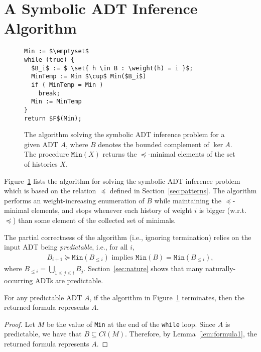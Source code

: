 \section{A Symbolic ADT Inference Algorithm}
\label{sec:algorithm}

\begin{figure}
\begin{lstlisting}
Min := $\emptyset$
while (true) {
  $B_i$ := $ \set{ h \in B : \weight(h) = i }$;
  MinTemp := Min $\cup$ Min($B_i$)
  if ( MinTemp = Min )
    break;
  Min := MinTemp
}
return $F$(Min);
\end{lstlisting}
\caption{The algorithm solving the symbolic ADT inference problem for a given ADT $A$, where $B$ denotes the bounded complement of $\ker A$. The procedure $\texttt{Min}(X)$ returns the $\preceq$-minimal elements of the set of histories $X$. %
}
\label{fig:algorithm}
\end{figure}

Figure~\ref{fig:algorithm} lists the algorithm for solving the symbolic ADT inference problem which is based on the relation $\preceq$
defined in Section~\ref{sec:patterns}.
The algorithm performs an weight-increasing enumeration of $B$ while maintaining the
$\preceq$-minimal elements, and stops whenever each history of weight $i$ is bigger (w.r.t. $\preceq$) than some
element of the collected set of minimals.

The partial correctness of the algorithm (i.e., ignoring termination) relies on the input ADT being \emph{predictable}, i.e.,
for all $i$,
\begin{align*}
B_{i+1} \succeq \texttt{Min}(B_{\leq i}) \mbox{ implies } \texttt{Min}(B) = \texttt{Min}(B_{\leq i}),
\end{align*}
where $B_{\leq i}=\bigcup_{1\leq j\leq i}B_j$.
Section~\ref{sec:nature} shows that many naturally-occurring ADTs are predictable.

\begin{theorem}\label{th:corr1}
For any predictable ADT $A$, if the algorithm in Figure~\ref{fig:algorithm} terminates, then the returned formula represents $A$.
\end{theorem}
\begin{proof}
Let $M$ be the value of \texttt{Min} at the end of the \texttt{while} loop.
Since $A$ is predictable, we have that $B \subseteq Cl(M)$. %
Therefore, by Lemma~\ref{lem:formula1}, the returned formula represents $A$.
\end{proof}

